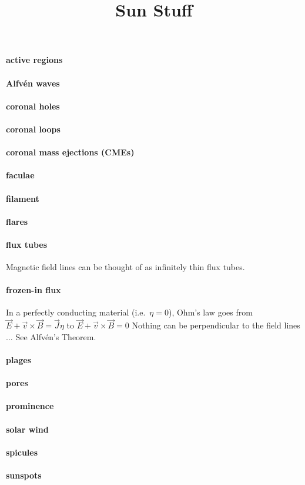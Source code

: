 \documentclass[12pt]{article}
\title{\vspace{-0.5in}Sun Stuff}
\author{}
\date{}
\begin{document}
\maketitle

\vspace{-1in}

\paragraph{active regions}
\paragraph{Alfv\'en waves}
\paragraph{coronal holes}
\paragraph{coronal loops}
\paragraph{coronal mass ejections (CMEs)}
\paragraph{faculae}
\paragraph{filament}
\paragraph{flares}
\paragraph{flux tubes} Magnetic field lines can be thought of as infinitely
thin flux tubes.
\paragraph{frozen-in flux}
In a perfectly conducting material (i.e.\ $\eta = 0$),
Ohm's law goes from
$ \vec{E} + \vec{v} \times \vec{B} = \vec{J}\eta $ to
$ \vec{E} + \vec{v} \times \vec{B} = 0 $
Nothing can be perpendicular to the field lines $\ldots$
See Alfv\'en's Theorem.

\paragraph{plages}
\paragraph{pores}
\paragraph{prominence}
\paragraph{solar wind}
\paragraph{spicules}
\paragraph{sunspots}
\end{document}
